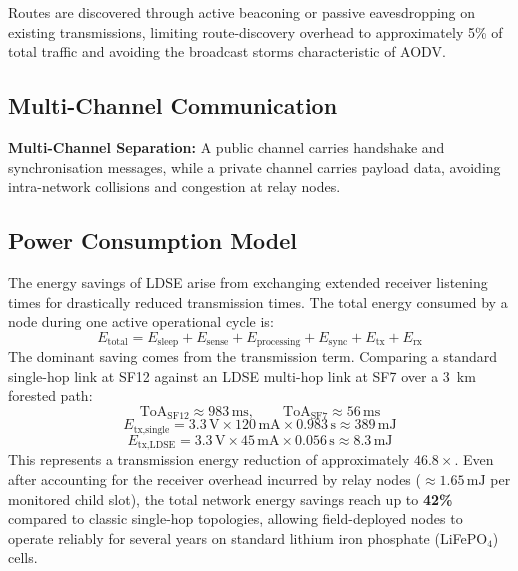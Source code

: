 Routes are discovered through active beaconing or passive eavesdropping on
existing transmissions, limiting route-discovery overhead to approximately 5\%
of total traffic and avoiding the broadcast storms characteristic of AODV.


\subsection{Multi-Channel Communication}
\label{subsec:ldse-multichannel}

\textbf{Multi-Channel Separation:} A public channel carries handshake and
synchronisation messages, while a private channel carries payload data, avoiding
intra-network collisions and congestion at relay nodes.


\subsection{Power Consumption Model}

The energy savings of LDSE arise from exchanging extended receiver listening
times for drastically reduced transmission times. The total energy consumed by a
node during one active operational cycle is:
\begin{equation}
\label{eq:total_energy}
E_{\text{total}} = E_{\text{sleep}} + E_{\text{sense}}
+ E_{\text{processing}} + E_{\text{sync}}
+ E_{\text{tx}} + E_{\text{rx}}
\end{equation}
The dominant saving comes from the transmission term. Comparing a standard
single-hop link at SF12 against an LDSE multi-hop link at SF7 over a 3~km
forested path:
\[
  \text{ToA}_{\text{SF12}} \approx 983\,\text{ms}, \qquad
  \text{ToA}_{\text{SF7}}  \approx 56\,\text{ms}
\]
\[
  E_{\text{tx,single}} = 3.3\,\text{V} \times 120\,\text{mA}
                          \times 0.983\,\text{s} \approx 389\,\text{mJ}
\]
\[
  E_{\text{tx,LDSE}}   = 3.3\,\text{V} \times 45\,\text{mA}
                          \times 0.056\,\text{s} \approx 8.3\,\text{mJ}
\]
This represents a transmission energy reduction of approximately $46.8\times$.
Even after accounting for the receiver overhead incurred by relay nodes
($\approx 1.65\,\text{mJ}$ per monitored child slot), the total network energy
savings reach up to \textbf{42\%} compared to classic single-hop topologies,
allowing field-deployed nodes to operate reliably for several years on standard
lithium iron phosphate (LiFePO$_4$) cells.


